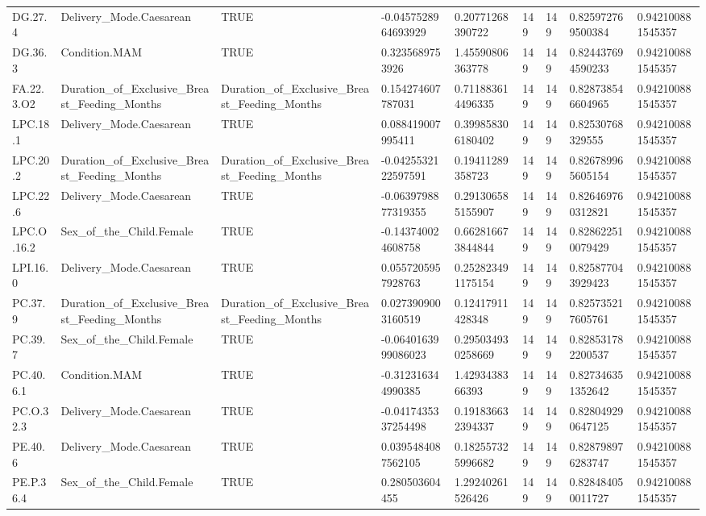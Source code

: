 \begin{longtable}{lllllllll}
DG.27.4 & Delivery\_Mode.Caesarean & TRUE & -0.0457528964693929 & 0.20771268390722 & 149 & 149 & 0.825972769500384 & 0.942100881545357 \\
DG.36.3 & Condition.MAM & TRUE & 0.3235689753926 & 1.45590806363778 & 149 & 149 & 0.824437694590233 & 0.942100881545357 \\
FA.22.3.O2 & Duration\_of\_Exclusive\_Breast\_Feeding\_Months & Duration\_of\_Exclusive\_Breast\_Feeding\_Months & 0.154274607787031 & 0.711883614496335 & 149 & 149 & 0.828738546604965 & 0.942100881545357 \\
LPC.18.1 & Delivery\_Mode.Caesarean & TRUE & 0.088419007995411 & 0.399858306180402 & 149 & 149 & 0.82530768329555 & 0.942100881545357 \\
LPC.20.2 & Duration\_of\_Exclusive\_Breast\_Feeding\_Months & Duration\_of\_Exclusive\_Breast\_Feeding\_Months & -0.0425532122597591 & 0.19411289358723 & 149 & 149 & 0.826789965605154 & 0.942100881545357 \\
LPC.22.6 & Delivery\_Mode.Caesarean & TRUE & -0.0639798877319355 & 0.291306585155907 & 149 & 149 & 0.826469760312821 & 0.942100881545357 \\
LPC.O.16.2 & Sex\_of\_the\_Child.Female & TRUE & -0.143740024608758 & 0.662816673844844 & 149 & 149 & 0.828622510079429 & 0.942100881545357 \\
LPI.16.0 & Delivery\_Mode.Caesarean & TRUE & 0.0557205957928763 & 0.252823491175154 & 149 & 149 & 0.825877043929423 & 0.942100881545357 \\
PC.37.9 & Duration\_of\_Exclusive\_Breast\_Feeding\_Months & Duration\_of\_Exclusive\_Breast\_Feeding\_Months & 0.0273909003160519 & 0.12417911428348 & 149 & 149 & 0.825735217605761 & 0.942100881545357 \\
PC.39.7 & Sex\_of\_the\_Child.Female & TRUE & -0.0640163999086023 & 0.295034930258669 & 149 & 149 & 0.828531782200537 & 0.942100881545357 \\
PC.40.6.1 & Condition.MAM & TRUE & -0.312316344990385 & 1.4293438366393 & 149 & 149 & 0.827346351352642 & 0.942100881545357 \\
PC.O.32.3 & Delivery\_Mode.Caesarean & TRUE & -0.0417435337254498 & 0.191836632394337 & 149 & 149 & 0.828049290647125 & 0.942100881545357 \\
PE.40.6 & Delivery\_Mode.Caesarean & TRUE & 0.0395484087562105 & 0.182557325996682 & 149 & 149 & 0.828798976283747 & 0.942100881545357 \\
PE.P.36.4 & Sex\_of\_the\_Child.Female & TRUE & 0.280503604455 & 1.29240261526426 & 149 & 149 & 0.828484050011727 & 0.942100881545357 \\

\end{longtable}
